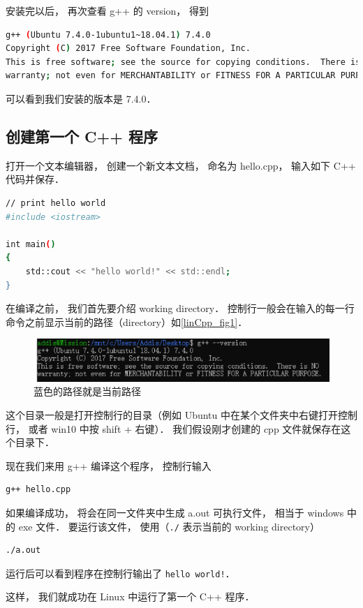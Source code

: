 安装完以后， 再次查看 g++ 的 version， 得到
\begin{lstlisting}[language=bash]
g++ (Ubuntu 7.4.0-1ubuntu1~18.04.1) 7.4.0
Copyright (C) 2017 Free Software Foundation, Inc.
This is free software; see the source for copying conditions.  There is NO
warranty; not even for MERCHANTABILITY or FITNESS FOR A PARTICULAR PURPOSE.
\end{lstlisting}
可以看到我们安装的版本是 7.4.0．


\subsection{创建第一个 C++ 程序}
打开一个文本编辑器， 创建一个新文本文档， 命名为 hello.cpp， 输入如下 C++ 代码并保存．
\begin{lstlisting}[language=bash]
// print hello world
#include <iostream>

int main()
{
    std::cout << "hello world!" << std::endl;
}
\end{lstlisting}
在编译之前， 我们首先要介绍 working directory． 控制行一般会在输入的每一行命令之前显示当前的路径（directory）如\autoref{linCpp_fig1}．
\begin{figure}[ht]
\centering
\includegraphics[width=14cm]{./figures/linCpp1.png}
\caption{蓝色的路径就是当前路径} \label{linCpp_fig1}
\end{figure}

这个目录一般是打开控制行的目录（例如 Ubuntu 中在某个文件夹中右键打开控制行， 或者 win10 中按 shift + 右键）． 我们假设刚才创建的 cpp 文件就保存在这个目录下．

现在我们来用 g++ 编译这个程序， 控制行输入
\begin{lstlisting}[language=bash]
g++ hello.cpp
\end{lstlisting}
如果编译成功， 将会在同一文件夹中生成 a.out 可执行文件， 相当于 windows 中的 exe 文件． 要运行该文件， 使用（\lstinline|./| 表示当前的 working directory）
\begin{lstlisting}[language=bash]
./a.out
\end{lstlisting}
运行后可以看到程序在控制行输出了 \lstinline|hello world!|．

这样， 我们就成功在 Linux 中运行了第一个 C++ 程序．
